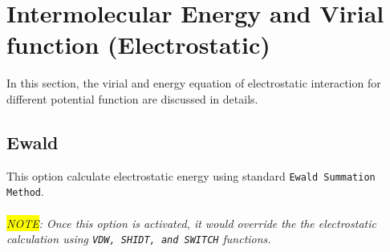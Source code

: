 \section{Intermolecular Energy and Virial function (Electrostatic)}
In this section, the virial and energy equation of electrostatic interaction for different potential function are discussed in details.

\subsection{Ewald} This option calculate electrostatic energy using standard \texttt{Ewald Summation Method}. \\\\
\textit{\colorbox{yellow}{NOTE}: Once this option is activated, it would override the the electrostatic calculation using \texttt{VDW, SHIDT, and SWITCH} functions.}

